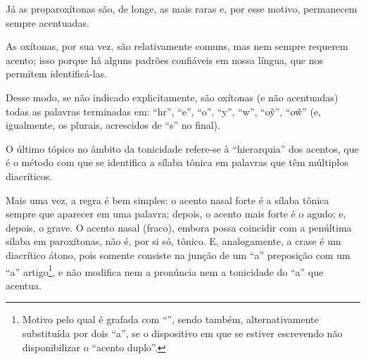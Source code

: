 \documentclass[12pt, a5paper, titlepage]{article}
\begin{document}
Já as proparoxítonas são, de longe, as mais raras e, por esse motivo, permanecem sempre acentuadas.

As oxítonas, por sua vez, são relativamente comuns, mas nem sempre requerem acento; isso porque há alguns padrões confiáveis em nossa língua, que nos permitem identificá-las.

Desse modo, se não indicado explicitamente, são oxítonas (e não acentuadas) todas as palavras terminadas em: ``hr'', ``e'', ``o'', ``y'', ``w'', ``o\~y'', ``o\~w'' (e, igualmente, os plurais, acrescidos de ``s'' no final).

O último tópico no âmbito da tonicidade refere-se à ``hierarquia'' dos acentos, que é o método com que se identifica a sílaba tônica em palavras que têm múltiplos diacríticos.

Mais uma vez, a regra é bem simples: o acento nasal forte é a sílaba tônica sempre que aparecer em uma palavra; depois, o acento mais forte é o agudo; e, depois, o grave. O acento nasal (fraco), embora possa coincidir com a penúltima sílaba em paroxítonas, não é, por si só, tônico. E, analogamente, a crase é um diacrítico átono, pois somente consiste na junção de um ``a'' preposição com um ``a'' artigo\footnote{Motivo pelo qual é grafada com ``\textasciidieresis'', sendo também, alternativamente substituída por dois ``a'', se o dispositivo em que se estiver escrevendo não disponibilizar o ``acento duplo''.}, e não modifica nem a pronúncia nem a tonicidade do ``a'' que acentua.
\end{document}
